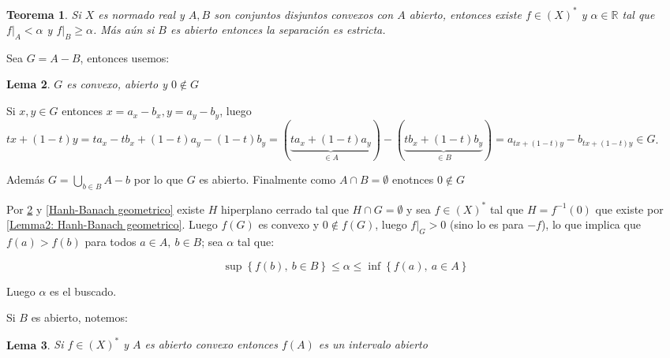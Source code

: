 \documentclass[11pt]{article}
\newcommand{\R}{{\mathbb{R}}}
\newcommand{\dual}[1]{\left(#1\right)^{\ast}}
\newcommand{\sett}[1]{\left\lbrace#1\right\rbrace}
\newcommand{\Bigcup}[2]{\bigcup\limits_{#1}{#2}}
\newtheorem{theorem}{Teorema}
\numberwithin{theorem}{subsection}
\newtheorem{lemma}[theorem]{Lema}
\newenvironment{proof}[1][Demostraci\'on]{\begin{trivlist}
		\item[\hskip \labelsep {\bfseries #1}]}{\end{trivlist}}
\newcommand{\qed}{\nobreak \ifvmode \relax \else
	\ifdim\lastskip<1.5em \hskip-\lastskip
	\hskip1.5em plus0em minus0.5em \fi \nobreak
	\vrule height0.75em width0.5em depth0.25em\fi}
\begin{document}
\begin{theorem}
	\label{Dos convexos en un normado se separan si uno es abierto}
	Si $X$ es normado real y $A,B$ son conjuntos disjuntos convexos con $A$ abierto, entonces existe $f \in \dual{X}$ y $\alpha \in \R$ tal que $f \vert_A < \alpha$ y $f \vert_B \geq \alpha$. M\'as a\'un si $B$ es abierto entonces la separaci\'on es estricta.
\end{theorem}
\begin{proof}
	Sea $G = A - B$, entonces usemos:
	
	\begin{lemma}
		\label{Lemma1: Dos convexos en un normado se separan si uno es abierto}
		$G$ es convexo, abierto y $0 \not \in G$
	\end{lemma}
	
	\begin{proof}[Demostraci\'on del lema]
		Si $x,y \in G$ entonces $x = a_x-b_x, y = a_y-b_y$, luego $tx + (1-t)y = ta_x - t b_x + (1-t)a_y - (1-t)b_y = \left(\underbrace{ta_x + (1-t)a_y}_{\in A}\right) - \left(\underbrace{tb_x + (1-t)b_y}_{\in B}\right) = a_{tx + (1-t)y} - b_{tx + (1-t)y} \in G$.
		
		Adem\'as $G = \Bigcup{b \in B}{A-b}$ por lo que $G$ es abierto. Finalmente como $A \cap B = \emptyset$ enotnces $0 \not \in G$\qed
		
	\end{proof}
	
	Por \ref{Lemma1: Dos convexos en un normado se separan si uno es abierto} y \ref{Hanh-Banach geometrico} existe $H$ hiperplano cerrado tal que $H \cap G = \emptyset$ y sea $f \in \dual{X}$ tal que $H = f^{-1}(0)$ que existe por \ref{Lemma2: Hanh-Banach geometrico}. Luego $f(G)$ es convexo y $0 \not \in f(G)$, luego $f \vert_G > 0$ (sino lo es para $-f$), lo que implica que $f(a) > f(b)$ para todos $a \in A, \ b \in B$; sea $\alpha$ tal que:
	
	\begin{equation*}
		\sup \sett{f(b), \ b \in B} \leq \alpha \leq \inf \sett{f(a), \ a \in A}
	\end{equation*}
	
	Luego $\alpha$ es el buscado.
	
	
	Si $B$ es abierto, notemos:
	
	\begin{lemma}
		\label{Lemma2: Dos convexos en un normado se separan si uno es abierto}
		Si $f \in \dual{X}$ y $A$ es abierto convexo entonces $f(A)$ es un intervalo abierto
	\end{lemma}
	

\end{proof}
\end{document}
